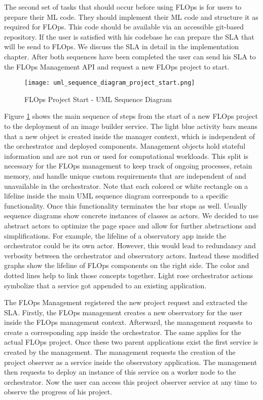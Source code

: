 The second set of tasks that should occur before using FLOps is for users to prepare their ML code.
They should implement their ML code and structure it as required for FLOps.
This code should be available via an accessible git-based repository.
If the user is satisfied with his codebase he can prepare the SLA that will be send to FLOps.
We discuss the SLA in detail in the implementation chapter.
After both sequences have been completed the user can send his SLA to the FLOps Management API and request a new FLOps project to start.

\begin{figure}[h]
    \begin{adjustwidth}{-0.2\paperwidth}{-0.2\paperwidth}
        \centering
        \texttt{[image: uml\_sequence\_diagram\_project\_start.png]}
        \caption{FLOps Project Start - UML Sequence Diagram}
        \label{fig:uml_sequence_project_start}
    \end{adjustwidth}
\end{figure}

Figure \ref{fig:uml_sequence_project_start} shows the main sequence of steps from the start of a new FLOps project to the deployment of an image builder service.
The light blue activity bars means that a new object is created inside the manager context, which is independent of the orchestrator and deployed components.
Management objects hold stateful information and are not run or used for computational workloads.
This split is necessary for the FLOps management to keep track of ongoing processes, retain memory, and handle unique custom requirements that are independent of and unavailable in the orchestrator.
Note that each colored or white rectangle on a lifeline inside the main UML sequence diagram corresponds to a specific functionality.
Once this functionality terminates the bar stops as well.
Usually sequence diagrams show concrete instances of classes as actors.
We decided to use abstract actors to optimize the page space and allow for further abstractions and simplifications.
For example, the lifeline of a observatory app inside the orchestrator could be its own actor.
However, this would lead to redundancy and verbosity between the orchestrator and observatory actors.
Instead these modified graphs show the lifeline of FLOps components on the right side.
The color and dotted lines help to link those concepts together.
Light rose orchestrator actions symbolize that a service got appended to an existing application.

The FLOps Management registered the new project request and extracted the SLA.
Firstly, the FLOps management creates a new observatory for the user inside the FLOps management context.
Afterward, the management requests to create a corresponding app inside the orchestrator.
The same applies for the actual FLOps project.
Once these two parent applications exist the first service is created by the management.
The management requests the creation of the project observer as a service inside the observatory application.
The management then requests to deploy an instance of this service on a worker node to the orchestrator.
Now the user can access this project observer service at any time to observe the progress of his project.

